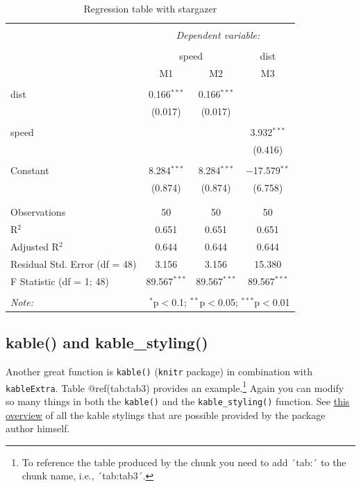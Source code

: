 \documentclass[
  12pt,
]{article}
\begin{document}
\begin{table}[H] \centering 
  \caption{Regression table with stargazer} 
  \label{tab2} 
\begin{tabular}{@{\extracolsep{5pt}}lccc} 
\\[-1.8ex]\hline 
\hline \\[-1.8ex] 
 & \multicolumn{3}{c}{\textit{Dependent variable:}} \\ 
\cline{2-4} 
\\[-1.8ex] & \multicolumn{2}{c}{speed} & dist \\ 
 & M1 & M2 & M3 \\ 
\hline \\[-1.8ex] 
 dist & 0.166$^{***}$ & 0.166$^{***}$ &  \\ 
  & (0.017) & (0.017) &  \\ 
  & & & \\ 
 speed &  &  & 3.932$^{***}$ \\ 
  &  &  & (0.416) \\ 
  & & & \\ 
 Constant & 8.284$^{***}$ & 8.284$^{***}$ & $-$17.579$^{**}$ \\ 
  & (0.874) & (0.874) & (6.758) \\ 
  & & & \\ 
\hline \\[-1.8ex] 
Observations & 50 & 50 & 50 \\ 
R$^{2}$ & 0.651 & 0.651 & 0.651 \\ 
Adjusted R$^{2}$ & 0.644 & 0.644 & 0.644 \\ 
Residual Std. Error (df = 48) & 3.156 & 3.156 & 15.380 \\ 
F Statistic (df = 1; 48) & 89.567$^{***}$ & 89.567$^{***}$ & 89.567$^{***}$ \\ 
\hline 
\hline \\[-1.8ex] 
\textit{Note:}  & \multicolumn{3}{r}{$^{*}$p$<$0.1; $^{**}$p$<$0.05; $^{***}$p$<$0.01} \\ 
\end{tabular} 
\end{table}

\hypertarget{kable-and-kable_styling}{%
\subsection{kable() and
kable\_styling()}\label{kable-and-kable_styling}}

Another great function is \texttt{kable()} (\texttt{knitr} package) in
combination with \texttt{kableExtra}. Table @ref(tab:tab3) provides an
example.\footnote{To reference the table produced by the chunk you need
  to add ´tab:´ to the chunk name, i.e., ´tab:tab3´.} Again you can
modify so many things in both the \texttt{kable()} and the
\texttt{kable\_styling()} function. See
\href{https://haozhu233.github.io/kableExtra/awesome_table_in_pdf.pdf}{this
overview} of all the kable stylings that are possible provided by the
package author himself.
\end{document}
